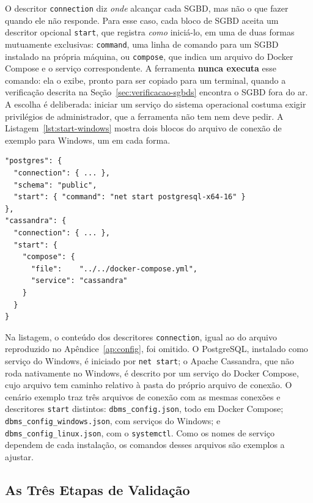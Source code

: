 O descritor \texttt{connection} diz \textit{onde} alcançar cada SGBD, mas não o que fazer
quando ele não responde. Para esse caso, cada bloco de SGBD aceita um descritor opcional
\texttt{start}, que registra \textit{como} iniciá-lo, em uma de duas formas mutuamente
exclusivas: \texttt{command}, uma linha de comando para um SGBD instalado na própria
máquina, ou \texttt{compose}, que indica um arquivo do Docker Compose e o serviço
correspondente. A ferramenta \textbf{nunca executa} esse comando: ela o exibe, pronto
para ser copiado para um terminal, quando a verificação descrita na
Seção~\ref{sec:verificacao-sgbds} encontra o SGBD fora do ar. A escolha é deliberada:
iniciar um serviço do sistema operacional costuma exigir privilégios de administrador,
que a ferramenta não tem nem deve pedir. A Listagem~\ref{lst:start-windows} mostra dois
blocos do arquivo de conexão de exemplo para Windows, um em cada forma.

\begin{lstlisting}[style=jsonstyle,caption={Descritores \texttt{start} nas duas formas (\texttt{dbms\_config\_windows.json}).},label={lst:start-windows}]
"postgres": {
  "connection": { ... },
  "schema": "public",
  "start": { "command": "net start postgresql-x64-16" }
},
"cassandra": {
  "connection": { ... },
  "start": {
    "compose": {
      "file":    "../../docker-compose.yml",
      "service": "cassandra"
    }
  }
}
\end{lstlisting}

Na listagem, o conteúdo dos descritores \texttt{connection}, igual ao do arquivo
reproduzido no Apêndice~\ref{ap:config}, foi omitido. O PostgreSQL, instalado como
serviço do Windows, é iniciado por \texttt{net start}; o
Apache Cassandra, que não roda nativamente no Windows, é descrito por um serviço do
Docker Compose, cujo arquivo tem caminho relativo à pasta do próprio arquivo de
conexão. O cenário exemplo traz três arquivos de conexão com as mesmas conexões e
descritores \texttt{start} distintos: \texttt{dbms\_config.json}, todo em Docker
Compose; \texttt{dbms\_config\_windows.json}, com serviços do Windows; e
\texttt{dbms\_config\_linux.json}, com o \texttt{systemctl}. Como os nomes de serviço
dependem de cada instalação, os comandos desses arquivos são exemplos a ajustar.

\subsection{As Três Etapas de Validação}
\label{sec:validacao}

